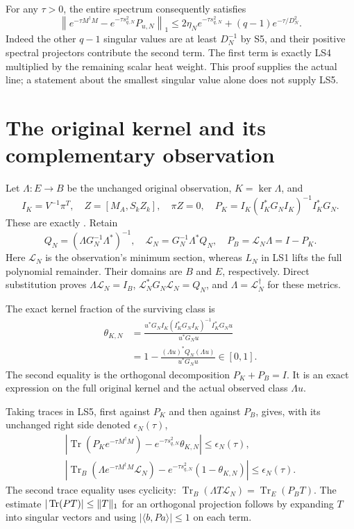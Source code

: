 \documentclass[11pt]{article}
\providecommand{\Tr}{\operatorname{Tr}}\providecommand{\Pp}{\mathcal P}
\begin{document}
For any $\tau>0$, the entire spectrum consequently satisfies
\[
\boxed{\left\|e^{-\tau M^\dagger M}
 -e^{-\tau s_{q,N}^2}P_{u,N}\right\|_1
 \le 2\eta_N e^{-\tau s_{q,N}^2}
 +(q-1)e^{-\tau/D_N^2}.}
\tag{LS5}
\]
Indeed the other $q-1$ singular values are at least $D_N^{-1}$
by S5, and their positive spectral projectors contribute the
second term. The first term is exactly LS4 multiplied by the
remaining scalar heat weight. This proof supplies the actual
line; a statement about the smallest singular value alone does
not supply LS5.

\section{The original kernel and its complementary observation}
Let $\Lambda:E\to B$ be the unchanged original observation,
$K=\ker\Lambda$, and
\[
I_K=V^{-1}\pi^T,\quad Z=[M_A,S_kZ_k],\quad \pi Z=0,\quad
P_K=I_K(I_K^*G_NI_K)^{-1}I_K^*G_N .
\tag{LS6}
\]
These are exactly \cite[MR1--10]{ls-MR}. Retain
\[
Q_N=(\Lambda G_N^{-1}\Lambda^*)^{-1},\quad
\mathcal L_N=G_N^{-1}\Lambda^*Q_N,\quad
P_B=\mathcal L_N\Lambda=I-P_K .
\]
Here $\mathcal L_N$ is the observation's minimum section, whereas
$L_N$ in LS1 lifts the full polynomial remainder. Their domains
are $B$ and $E$, respectively. Direct substitution proves
$\Lambda\mathcal L_N=I_B$,
$\mathcal L_N^*G_N\mathcal L_N=Q_N$, and
$\Lambda=\mathcal L_N^{\dagger}$ for these metrics.

The exact kernel fraction of the surviving class is
\[
\begin{split}
\theta_{K,N}
&=\frac{u^*G_N I_K(I_K^*G_NI_K)^{-1}I_K^*G_Nu}{u^*G_Nu}\\
&=1-\frac{(\Lambda u)^*Q_N(\Lambda u)}{u^*G_Nu}\in[0,1].
\end{split}\tag{LS7}
\]
The second equality is the orthogonal decomposition $P_K+P_B=I$.
It is an exact expression on the full original kernel and
the actual observed class $\Lambda u$.

Taking traces in LS5, first against $P_K$ and then against $P_B$,
gives, with its unchanged right side denoted $\epsilon_N(\tau)$,
\[
\begin{gathered}
\left|\Tr(P_K e^{-\tau M^\dagger M})
       -e^{-\tau s_{q,N}^2}\theta_{K,N}\right|
 \le\epsilon_N(\tau),\\
\left|\Tr_B\!\left(\Lambda e^{-\tau M^\dagger M}\mathcal L_N\right)
       -e^{-\tau s_{q,N}^2}(1-\theta_{K,N})\right|
 \le\epsilon_N(\tau).
\end{gathered}\tag{LS8}
\]
The second trace equality uses cyclicity:
$\Tr_B(\Lambda T\mathcal L_N)=\Tr_E(P_BT)$.
The estimate $|\Tr(PT)|\le\norm T_1$ for an orthogonal
projection follows by expanding $T$ into singular vectors and
using $|\langle b,Pa\rangle|\le1$ on each term.
\end{document}
